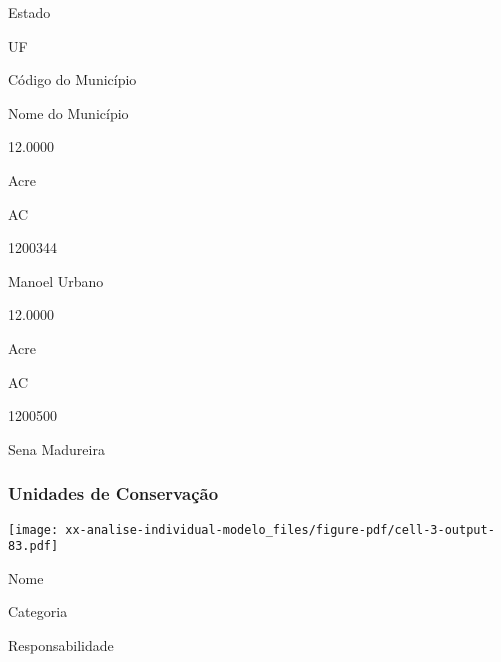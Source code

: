 \documentclass[
  11pt,
  a4paper,
  DIV=11,
  numbers=noendperiod]{scrartcl}
\begin{document}
Estado

\n      

UF

\n      

Código do Município

\n      

Nome do Município

\n    

\n  

\n  

\n    

\n      

12.0000

\n      

Acre

\n      

AC

\n      

1200344

\n      

Manoel Urbano

\n    

\n    

\n      

12.0000

\n      

Acre

\n      

AC

\n      

1200500

\n      

Sena Madureira

\n    

\n  

\n

\subsubsection{Unidades de
Conservação}\label{unidades-de-conservauxe7uxe3o-4}

\texttt{[image: xx-analise-individual-modelo\_files/figure-pdf/cell-3-output-83.pdf]}

\n  

\n    

\n      

Nome

\n      

Categoria

\n      

Responsabilidade

\n      
\end{document}
